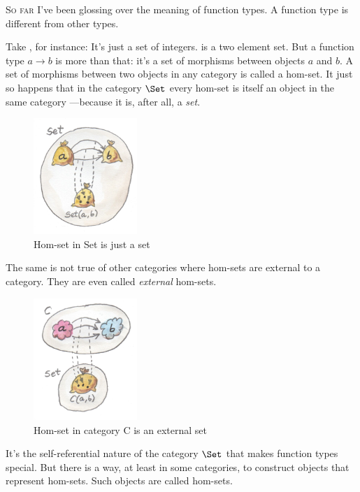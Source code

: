 
\lettrine[lhang=0.17]{S}{o far} I've been glossing over the meaning of function types. A function
type is different from other types.

Take , for instance: It's just a set of integers.
 is a two element set. But a function type
$a\to b$ is more than that: it's a set of morphisms
between objects $a$ and $b$. A set of morphisms between
two objects in any category is called a hom-set. It just so happens that
in the category $\Set$ every hom-set is itself an object in the
same category ---because it is, after all, a \emph{set}.

\begin{figure}[H]
\centering
\includegraphics[width=0.35\textwidth]{images/set-hom-set.jpg}
\caption{Hom-set in Set is just a set}
\end{figure}

\noindent
The same is not true of other categories where hom-sets are external to
a category. They are even called \emph{external} hom-sets.

\begin{figure}[H]
\centering
\includegraphics[width=0.35\textwidth]{images/hom-set.jpg}
\caption{Hom-set in category C is an external set}
\end{figure}

\noindent
It's the self-referential nature of the category $\Set$ that makes
function types special. But there is a way, at least in some categories,
to construct objects that represent hom-sets. Such objects are called
 hom-sets.

